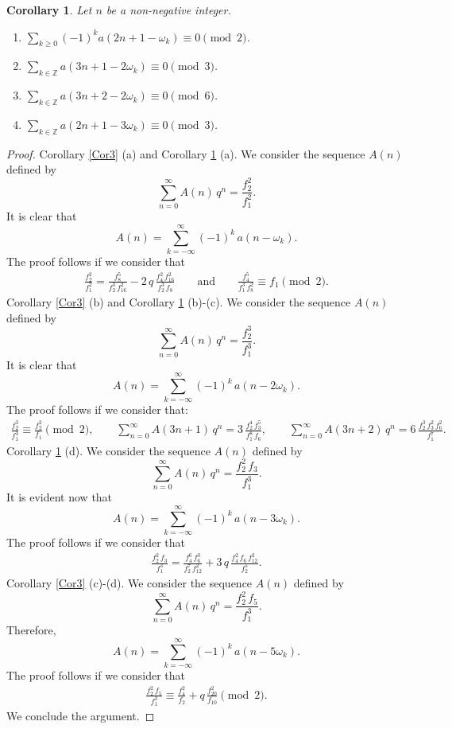 \documentclass{article}
\newtheorem{corollary}[theorem]{Corollary}
\begin{document}
\medskip

\begin{corollary} \label{Cor4} Let $n$ be a non-negative integer.
\begin{enumerate}
    \item [(a)] $\sum\limits_{k\geq0} (-1)^k a(2n+1-\omega_k)\equiv 0 \pmod 2$.
    \item [(b)] $\sum\limits_{k\in\mathbb{Z}}a(3n+1-2\omega_k) \equiv 0 \pmod 3$.
    \item [(c)] $\sum\limits_{k\in\mathbb{Z}} a(3n+2-2\omega_k)\equiv 0 \pmod 6$.
    \item [(d)] $\sum\limits_{k\in\mathbb{Z}} a(2n+1-3\omega_k) \equiv 0 \pmod 3$.
\end{enumerate}
\end{corollary}

\medskip

\begin{proof}

	Corollary \ref{Cor3} (a) and Corollary \ref{Cor4} (a). We consider the sequence $A(n)$ defined by
	$$
	\sum_{n=0}^\infty A(n)\,q^n = \frac{f_2^2}{f_1^2}.
	$$
		It is clear that
	$$
	A(n)=\sum_{k=-\infty}^\infty (-1)^k\,a\left(n-\omega_k\right).
	$$
	The proof follows if we consider that
	\begin{align*}
	\frac{f_2^2}{f_1^2} = \frac{f_8^5}{f_2^3\,f_{16}^2}-2\,q\, \frac{f_4^2\,f_{16}^2}{f_2^3\,f_8} \qquad \text{and} \qquad
	\frac{f_4^5}{f_1^3\,f_{8}^2} \equiv f_1 \pmod 2.
	\end{align*}
	Corollary \ref{Cor3} (b) and Corollary \ref{Cor4} (b)-(c).  We consider the sequence $A(n)$ defined by
	$$
	\sum_{n=0}^\infty A(n)\,q^n = \frac{f_2^3}{f_1^3}.
	$$
	It is clear that
	$$
	A(n)=\sum_{k=-\infty}^\infty (-1)^k\,a\left(n-2\omega_k\right).
	$$
	The proof follows if we consider that:
	\begin{align*}
	 \frac{f_2^3}{f_1^3} \equiv \frac{f_2^2}{f_1} \pmod 2, \qquad
	 \sum_{n=0}^\infty A(3n+1)\,q^n =3\, \frac{f_2^4\,f_3^5}{f_1^8\,f_6}, \qquad
	 \sum_{n=0}^\infty A(3n+2)\,q^n =6\, \frac{f_2^3\,f_3^2\,f_6^2}{f_1^7}.
	\end{align*}
	Corollary \ref{Cor4} (d).  We consider the sequence $A(n)$ defined by
	$$
	\sum_{n=0}^\infty A(n)\,q^n = \frac{f_2^2\,f_3}{f_1^3}.
	$$
	It is evident now that
	$$
	A(n)=\sum_{k=-\infty}^\infty (-1)^k\,a\left(n-3\omega_k\right).
	$$
	The proof follows if we consider that
	\begin{align*}
	\frac{f_2^2\,f_3}{f_1^3} = \frac{f_4^6\,f_6^3}{f_2^7\,f_{12}^2} + 3\,q\,\frac{f_4^2\,f_6\,f_{12}^2}{f_2^5}.
	\end{align*}
	Corollary \ref{Cor3} (c)-(d). We consider the sequence $A(n)$ defined by
	$$
	\sum_{n=0}^\infty A(n)\,q^n = \frac{f_2^2\,f_5}{f_1^3}.
	$$
	Therefore, 
	$$
	A(n)=\sum_{k=-\infty}^\infty (-1)^k\,a\left(n-5\omega_k\right).
	$$
	The proof follows if we consider that
	\begin{align*}
	\frac{f_2^2\,f_5}{f_1^3} \equiv \frac{f_4^2}{f_2} + q\,\frac{f_{20}^2}{f_{10}} \pmod 2.
	\end{align*}
We conclude the argument.
\end{proof}
\end{document}
